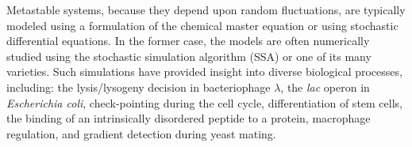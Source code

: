 
Metastable systems, because they depend upon random fluctuations, are typically modeled using a formulation of the chemical master equation\supercite{Qian:2010if,Roberts:2015iu} or using stochastic differential equations\supercite{Wu:2013dx}. In the former case, the models are often numerically studied using the stochastic simulation algorithm\supercite{Gillespie:1976bj,Gillespie:2007bx} (SSA) or one of its many varieties\supercite{Bratsun:2005cs,Cao:2004cu,Gibson:2000jq}. Such simulations have provided insight into diverse biological processes, including: the lysis/lysogeny decision in bacteriophage $\lambda$\supercite{Cao:2010dp}, the \textit{lac} operon in \textit{Escherichia coli}\supercite{Roberts:2011cs},  check-pointing during the cell cycle\supercite{Li:2014iw}, differentiation of stem cells\supercite{Zhang:2014bu}, the binding of an intrinsically disordered peptide to a protein\supercite{Zwier:2016fx}, macrophage regulation\supercite{Smith:2016gj}, and gradient detection during yeast mating\supercite{Sharma:2016gw}.

